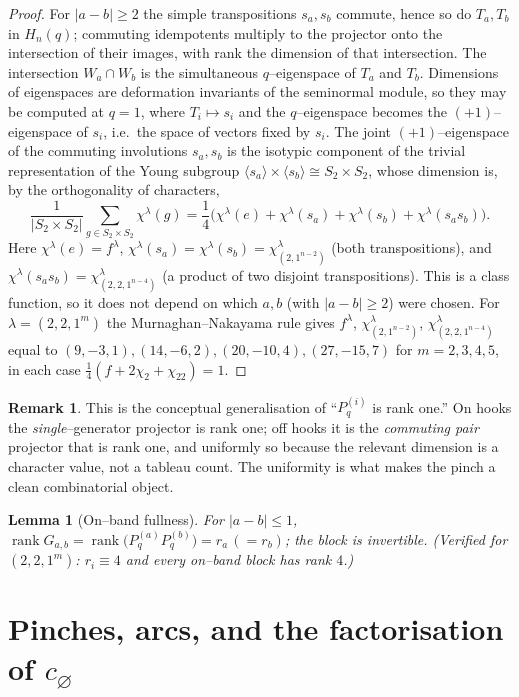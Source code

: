 \documentclass[11pt]{article}
\newtheorem{lemma}[theorem]{Lemma}
\theoremstyle{definition}
\newtheorem{remark}[theorem]{Remark}
\DeclareMathOperator{\rank}{rank}
\newcommand{\Pq}{P_{q}}
\newcommand{\la}{\lambda}
\newcommand{\W}{W}
\begin{document}
\begin{proof}
For $|a-b|\ge2$ the simple transpositions $s_a,s_b$ commute, hence so do $T_a,T_b$
in $H_n(q)$; commuting idempotents multiply to the projector onto the intersection of
their images, with rank the dimension of that intersection. The intersection $\W_a\cap\W_b$
is the simultaneous $q$--eigenspace of $T_a$ and $T_b$. Dimensions of eigenspaces are
deformation invariants of the seminormal module, so they may be computed at $q=1$, where
$T_i\mapsto s_i$ and the $q$--eigenspace becomes the $(+1)$--eigenspace of $s_i$, i.e.\ the
space of vectors fixed by $s_i$. The joint $(+1)$--eigenspace of the commuting involutions
$s_a,s_b$ is the isotypic component of the trivial representation of the Young subgroup
$\langle s_a\rangle\times\langle s_b\rangle\cong S_2\times S_2$, whose dimension is, by
the orthogonality of characters,
\[
\frac1{|S_2\times S_2|}\sum_{g\in S_2\times S_2}\chi^\la(g)
=\frac14\bigl(\chi^\la(e)+\chi^\la(s_a)+\chi^\la(s_b)+\chi^\la(s_as_b)\bigr).
\]
Here $\chi^\la(e)=f^\la$, $\chi^\la(s_a)=\chi^\la(s_b)=\chi^\la_{(2,1^{n-2})}$ (both
transpositions), and $\chi^\la(s_as_b)=\chi^\la_{(2,2,1^{n-4})}$ (a product of two disjoint
transpositions). This is a class function, so it does not depend on which $a,b$ (with
$|a-b|\ge2$) were chosen. For $\la=(2,2,1^m)$ the Murnaghan--Nakayama rule gives
$f^\la$, $\chi^\la_{(2,1^{n-2})}$, $\chi^\la_{(2,2,1^{n-4})}$ equal to
$(9,-3,1),(14,-6,2),(20,-10,4),(27,-15,7)$ for $m=2,3,4,5$, in each case
$\tfrac14(f+2\chi_2+\chi_{22})=1$.
\end{proof}

\begin{remark}
This is the conceptual generalisation of ``$\Pq^{(i)}$ is rank one.'' On hooks the
\emph{single}--generator projector is rank one; off hooks it is the \emph{commuting pair}
projector that is rank one, and uniformly so because the relevant dimension is a character
value, not a tableau count. The uniformity is what makes the pinch a clean combinatorial
object.
\end{remark}

\begin{lemma}[On--band fullness]\label{lem:onband}
For $|a-b|\le1$, $\rank G_{a,b}=\rank\bigl(\Pq^{(a)}\Pq^{(b)}\bigr)=r_a\,(=r_b)$; the block
is invertible. \textup{(Verified for $(2,2,1^m)$: $r_i\equiv4$ and every on--band block has
rank $4$.)}
\end{lemma}

\section{Pinches, arcs, and the factorisation of $c_\varnothing$}
\end{document}
